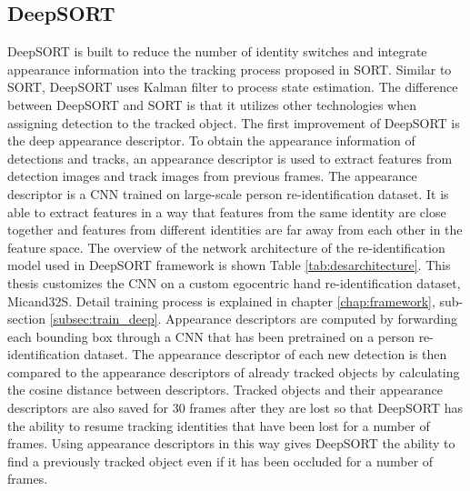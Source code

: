 \subsection{DeepSORT} \label{sec:deepSORT}
DeepSORT is built to reduce the number of identity switches and integrate appearance information into the tracking process proposed in SORT. Similar to SORT, DeepSORT uses Kalman filter to process state estimation. The difference between DeepSORT and SORT is that it utilizes other technologies when assigning detection to the tracked object.
The first improvement of DeepSORT is the deep appearance descriptor.  To obtain the appearance information of detections and tracks, an appearance descriptor is used to extract features from detection images and track images from previous frames. The appearance descriptor is a CNN trained on large-scale person re-identification dataset. It is able to extract features in a way that features from the same identity are close together and features from different identities are far away from each other in the feature space. The overview of the network architecture of the re-identification model used in DeepSORT framework is shown Table \ref{tab:desarchitecture}.
This thesis customizes the CNN on a custom egocentric hand re-identification dataset, Micand32S. Detail training process is explained in chapter \ref{chap:framework}, sub-section \ref{subsec:train_deep}. Appearance descriptors are computed by forwarding each bounding box through a CNN that has been pretrained on a person re-identification dataset. The appearance descriptor of each new detection is then compared to the appearance descriptors of already tracked objects by calculating the cosine distance between descriptors. Tracked objects and their appearance descriptors are also saved for 30 frames after they are lost so that DeepSORT has the ability to resume tracking identities that have been lost for a number of frames. Using appearance descriptors in this way gives DeepSORT the ability to find a previously tracked object even if it has been occluded for a number of frames.
